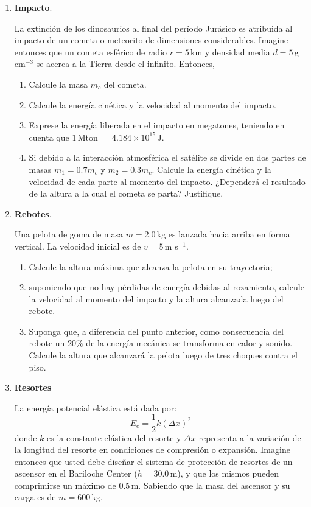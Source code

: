\documentclass[a4paper,12pt]{article}
\begin{document}
\begin{enumerate}
\item {\bf{Impacto}}.

La extinción de los dinosaurios al final del período Jurásico es atribuida al
impacto de un cometa o meteorito de dimensiones considerables. Imagine entonces
que un cometa esférico de radio $r=5$\,km y densidad media $d=5$\,g\,cm$^{-3}$
se acerca a la Tierra desde el infinito. Entonces,

\begin{enumerate}
\item Calcule la masa $m_c$ del cometa.
\item Calcule la energía cinética y la velocidad al momento del impacto.
\item Exprese la energía liberada en el impacto en megatones, teniendo en cuenta
que $1$\,Mton $= 4.184 \times 10^{15}$\,J.
\item Si debido a la interacción atmosférica el satélite se divide en dos partes
de masas $m_1=0.7 m_c$ y $m_2=0.3 m_c$. Calcule la energía cinética y la
velocidad de cada parte al momento del impacto. ¿Dependerá el resultado de la
altura a la cual el cometa se parta? Justifique.
\end{enumerate}

\item {\bf{Rebotes}}.

Una pelota de goma de masa $m=2.0$\,kg es lanzada hacia arriba en forma
vertical. La velocidad inicial es de $v=5$\,m s$^{-1}$.
\begin{enumerate}
\item Calcule la altura máxima que alcanza la pelota en su trayectoria;
\item suponiendo que no hay pérdidas de energía debidas al rozamiento, calcule
la velocidad al momento del impacto y la altura alcanzada luego del rebote.
\item Suponga que, a diferencia del punto anterior, como consecuencia del
rebote un $20\%$ de la energía mecánica se transforma en calor y sonido.
Calcule la altura que alcanzará la pelota luego de tres choques contra el piso.
\end{enumerate}

\item{\bf{Resortes}}

La energía potencial elástica está dada por:
\[E_e = \frac{1}{2} k (\Delta x)^2 \]
donde $k$ es la constante elástica del resorte y $\Delta x$ representa a la
variación de la longitud del resorte en condiciones de compresión o expansión.
Imagine entonces que usted debe diseñar el sistema de protección de resortes de
un ascensor en el Bariloche Center ($h=30.0$\,m), y que los mismos pueden
comprimirse un máximo de $0.5$\,m. Sabiendo que la masa del ascensor y su carga
es de $m=600$\,kg, 


\end{enumerate}
\end{document}
